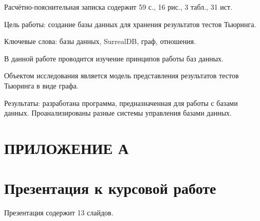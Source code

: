 




    \normalsize




Расчётно-пояснительная записка содержит 59 с., 16 рис., 3 табл., 31 ист.

Цель работы: создание базы данных для хранения результатов тестов Тьюринга.

Ключевые слова: базы данных, SurrealDB, граф, отношения.

В данной работе проводится изучение принципов работы баз данных.

Объектом исследования является модель представления результатов тестов Тьюринга в виде графа.

Результаты: разработана программа, предназначенная для работы с базами данных. Проанализированы разные системы управления базами данных.

\pagebreak

\newpage
\renewcommand{\contentsname}{\normalsize\bfseries\centering СОДЕРЖАНИЕ}
    \tableofcontents
    \normalsize













\section*{\centering ПРИЛОЖЕНИЕ А}

\section*{Презентация к курсовой работе}
Презентация содержит 13 слайдов.

